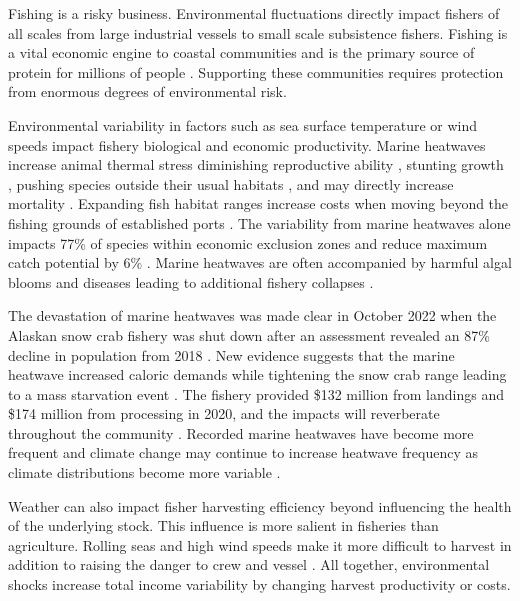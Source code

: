 \documentclass[
  super,
  preprint,
  3p]{elsarticle}
\theoremstyle{plain}
\theoremstyle{plain}
\theoremstyle{remark}
\begin{document}
Fishing is a risky business. Environmental fluctuations directly impact
fishers of all scales from large industrial vessels to small scale
subsistence fishers. Fishing is a vital economic engine to coastal
communities and is the primary source of protein for millions of people
\citep{Sumaila2012, Teh2013, fao2020}. Supporting these communities
requires protection from enormous degrees of environmental risk.

Environmental variability in factors such as sea surface temperature or
wind speeds impact fishery biological and economic productivity. Marine
heatwaves increase animal thermal stress diminishing reproductive
ability \citep{Barbeaux2020}, stunting growth \citep{Pandori2019},
pushing species outside their usual habitats \citep{Cavole2016}, and may
directly increase mortality \citep{Smith2023}. Expanding fish habitat
ranges increase costs when moving beyond the fishing grounds of
established ports \citep{rogers2019}. The variability from marine
heatwaves alone impacts 77\% of species within economic exclusion zones
and reduce maximum catch potential by 6\% \citep{Cheung2021}. Marine
heatwaves are often accompanied by harmful algal blooms and diseases
leading to additional fishery collapses \citep{Oken2021}.

The devastation of marine heatwaves was made clear in October 2022 when
the Alaskan snow crab fishery was shut down after an assessment revealed
an 87\% decline in population from 2018 \citep{Zacher2022}. New evidence
suggests that the marine heatwave increased caloric demands while
tightening the snow crab range leading to a mass starvation event
\citep{Szuwalski2023}. The fishery provided \$132 million from landings
and \$174 million from processing in 2020, and the impacts will
reverberate throughout the community \citep{Garber2022}. Recorded marine
heatwaves have become more frequent \citep{Holbrook2019} and climate
change may continue to increase heatwave frequency as climate
distributions become more variable \citep{frolicher2018}.

Weather can also impact fisher harvesting efficiency beyond influencing
the health of the underlying stock. This influence is more salient in
fisheries than agriculture. Rolling seas and high wind speeds make it
more difficult to harvest \citep{Alvarez2006} in addition to raising the
danger to crew and vessel \citep{Heck2021}. All together, environmental
shocks increase total income variability by changing harvest
productivity or costs.
\end{document}
